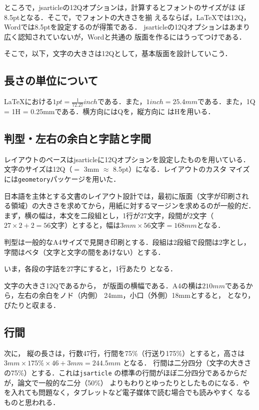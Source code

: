 \documentclass[a4j, 12Q, twocolumn, twoside, draft]{jsarticle}
\begin{document}
  ところで，jsarticleの12Qオプションは，計算するとフォントのサイズがほ
  ぼ8.5ptとなる．そこで，でフォントの大きさを揃
  えるならば，\LaTeX では12Q，Wordでは8.5ptを設定するのが得策である．
  jsarticleの12Qオプションはあまり広く認知されていないが，Wordと共通の
  版面を作るにはうってつけである．

  そこで，以下，文字の大きさは12Qとして，基本版面を設計していこう．

\subsection{長さの単位について}
  \LaTeX における$1 pt = \frac{1}{72.27} inch$である．また，$1 inch =
  25.4 mm$である．また，1Q = 1H = 0.25mmである．横方向にはQを，縦方向に
  はHを用いる．
\subsection{判型・左右の余白と字詰と字間}

レイアウトのベースはjsarticleに12Qオプションを設定したものを用いている．
文字のサイズは12Q（$=$ 3mm $\approx$ 8.5pt）になる．レイアウトのカスタ
マイズには\texttt{geometory}パッケージを用いた．

日本語を主体とする文書のレイアウト設計では，最初に版面（文字が印刷され
る領域）の大きさを求めてから，用紙に対するマージンを求めるのが一般的だ．
まず，横の幅は，本文を二段組とし，1行が27文字，段間が2文字（$27 \times
2 + 2 = 56$文字）とすると，幅は$3mm \times 56文字 = 168mm$となる．

  判型は一般的なA4サイズで見開き印刷とする．段組は2段組で段間は2字とし，
  字間はベタ（文字と文字の間をあけない）とする．

  いま，各段の字詰を27字にすると，1行あたり
\nlines{
  \[
   27字 + 2字 + 27字 = 56字
  \]
}
  となる．

  文字の大きさ12Qであるから，
\nlines{
  \[
   12Q \times 0.25 mm \times 56字 = 168 mm
  \]
}
  が版面の横幅である．A4の横は$210mm$であるから，左右の余白をノド（内側）
  24mm，小口（外側）18mmとすると，
\nlines{
  \[
   168mm + 24mm + 18mm = 210mm
  \]
}
  となり，ぴたりと収まる．

\subsection{行間}
次に，
縦の長さは，行数47行，行間を75\%（行送り175\%）とすると，高さは$3mm
\times 175\% \times 46 + 3mm = 244.5mm$ となる．
  行間は二分四分（文字の大きさの75\%）とする．これは\texttt{jsarticle}
  の標準の行間がほぼ二分四分であるからだが，論文で一般的な二分（50\%）
  よりもわりとゆったりとしたものになる．やを入れても問題なく，タブレットなど電子媒体で読む場合でも読みやすく
  なるものと思われる．
\end{document}
